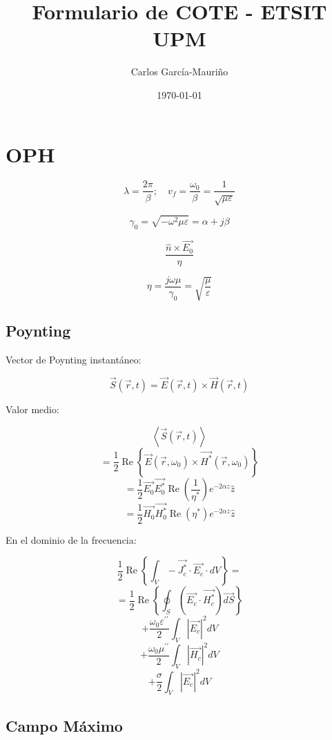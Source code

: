 \documentclass[12pt,a4paper]{article}
\title{Formulario de COTE - ETSIT UPM}
\author{Carlos García-Mauriño}
\date{\today}
\begin{document}
\maketitle

\twocolumn

\section{OPH}
\label{sec:ondas_planas_homogeneas}

\[ \lambda = \frac{2 \pi}{\beta}; \quad v_f = \frac{\omega_0}{\beta}  =
\frac{1}{\sqrt{\mu \varepsilon}} \]

\[ \gamma_0 = \sqrt{-\omega^2 \mu \varepsilon} = \alpha + j \beta \]

\[ \frac{\hat{n} \times \vec{E_0}}{\eta} \]

\[ \eta = \frac{j \omega \mu}{\gamma_0} = \sqrt{\frac{\mu}{\varepsilon}} \]

\subsection{Poynting}
\label{sub:poynting}

Vector de Poynting instantáneo:

\[ \vec{S} ( \vec{r}, t ) = \vec{E} ( \vec{r}, t ) \times \vec{H} ( \vec{r}, t
) \]

Valor medio:

\[ \left< \vec{S} ( \vec{r}, t ) \right> \]
\[ = \frac{1}{2} \operatorname{Re}\left\{ \vec{E}( \vec{r}, \omega_0 ) \times
\vec{H^*} ( \vec{r}, \omega_0)  \right\} \]
\[ = \frac{1}{2} \vec{E_0} \vec{E_0^*} \operatorname{Re}\left( \frac{1}{\eta^*}
\right) e^{-2 \alpha z} \hat{z} \]
\[ = \frac{1}{2} \vec{H_0} \vec{H_0^*} \operatorname{Re}\left( \eta^* \right)
e^{-2 \alpha z} \hat{z} \]

En el dominio de la frecuencia:

\[ \frac{1}{2} \operatorname{Re}\left\{ \int_V - \vec{J_{c}^*} \cdot
\vec{E_c} \cdot dV \right\} = \]
\[ = \frac{1}{2} \operatorname{Re}\left\{ \oint_S \left(\vec{E_{c}} \cdot
\vec{H_c^*} \right) \vec{dS} \right\} \] 
\[ + \frac{\omega_0 \varepsilon^{\prime\prime}}{2} \int_V | \vec{E_c} |^2 dV \]
\[ + \frac{\omega_0 \mu^{\prime\prime}}{2} \int_V | \vec{H_c} |^2 dV \]
\[ + \frac{\sigma}{2} \int_V | \vec{E_c} |^2 dV \]

\subsection{Campo Máximo}
\label{sub:campo_maximo}
\end{document}
